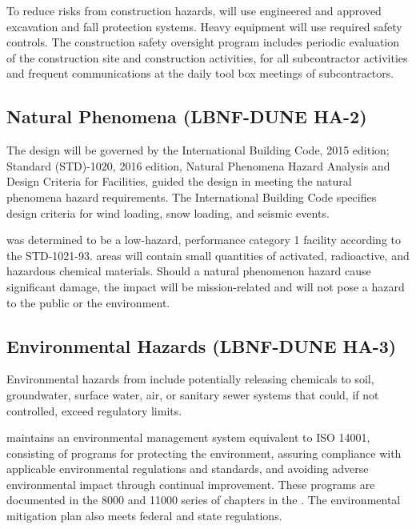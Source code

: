 To reduce risks from construction hazards, \fnal will use engineered
and approved excavation and fall protection systems.  Heavy equipment
will use required safety controls. The \fnal construction safety
oversight program includes periodic evaluation of the construction
site and construction activities,  for all
subcontractor activities and frequent  communications at
the daily tool box meetings of subcontractors.

\subsection{Natural Phenomena (LBNF-DUNE HA-2)}

The  design will be governed by the
International Building Code, 2015 edition;  Standard
(STD)-1020, 2016 edition, Natural Phenomena Hazard Analysis and Design
Criteria for  Facilities, guided the design in meeting the
natural phenomena hazard requirements.  The International Building
Code specifies design criteria for wind loading, snow loading, and
seismic events.

 was determined to be a low-hazard,
performance category 1 facility according to the 
STD-1021-93.  areas will contain small
quantities of activated, radioactive, and hazardous chemical
materials. Should a natural phenomenon hazard cause significant
damage, the impact will be mission-related and will not pose a hazard
to the public or the environment.

\subsection{Environmental Hazards (LBNF-DUNE HA-3)}

Environmental hazards from  include potentially releasing
chemicals to soil, groundwater, surface water, air, or sanitary sewer
systems that could, if not controlled, exceed regulatory limits.

\fnal maintains an environmental management system equivalent to ISO
14001, consisting of programs for protecting the environment, assuring
compliance with applicable environmental regulations and standards,
and avoiding adverse environmental impact through continual
improvement.  These programs are documented in the 8000 and 11000
series of chapters in the .  The environmental mitigation
plan also meets federal and state regulations.


